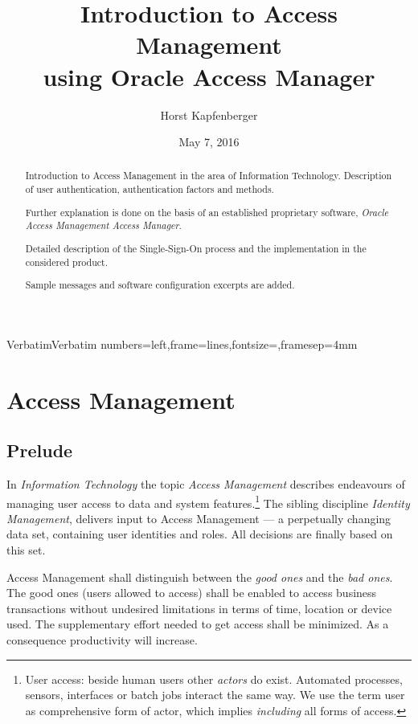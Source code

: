 \documentclass[11pt]{report}
\title{Introduction to Access Management \\
using Oracle Access Manager}
\author{Horst Kapfenberger}
\date{May 7, 2016}
\begin{document}
\RecustomVerbatimEnvironment
  {Verbatim}{Verbatim}
  {numbers=left,frame=lines,fontsize=\scriptsize,framesep=4mm}


\maketitle

\begin{abstract}
    Introduction to Access Management in the area of Information
    Technology.  Description of user authentication, authentication
    factors and methods.
   
    Further explanation is done on the basis of an established
    proprietary software, \emph{Oracle Access Management Access
    Manager}.
    
    Detailed description of the Single-Sign-On process and the
    implementation in the considered product.

    Sample messages and software configuration excerpts are added.
\end{abstract}


\tableofcontents


\chapter{Access Management}

\section{Prelude}

In \emph{Information Technology} the topic \emph{Access Management}
describes endeavours of managing user access to data and system
features.\footnote{User access:  beside human users other \emph{actors}
do exist.  Automated processes, sensors, interfaces or batch jobs
interact the same way.  We use the term user as comprehensive form of
actor, which implies \emph{including} all forms of access.} The sibling
discipline \emph{Identity Management}, delivers input to Access
Management --- a perpetually changing data set, containing user
identities and roles. All decisions are finally based on this set.

Access Management shall distinguish between the \emph{good ones} and the
\emph{bad ones}.  The good ones (users allowed to access) shall be
enabled to access business transactions without undesired limitations in
terms of time, location or device used. The supplementary effort needed
to get access shall be minimized.  As a consequence productivity will
increase.
\end{document}
